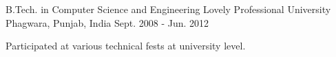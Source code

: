 

\begin{cventries}

  \cventry
    {B.Tech. in Computer Science and Engineering} %
    {Lovely Professional University} %
    {Phagwara, Punjab, India} %
    {Sept. 2008 - Jun. 2012} %
    {
      \begin{cvitems} %
        \item {Participated at various technical fests at university level.}
      \end{cvitems}
    }

\end{cventries}
